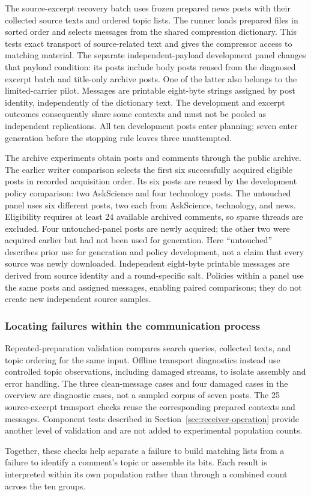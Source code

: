 The source-excerpt recovery batch uses \DsExcerptPosts{} frozen prepared news posts with their collected source texts and ordered topic lists. The runner loads prepared files in sorted order and selects messages from the shared compression dictionary. This tests exact transport of source-related text and gives the compressor access to matching material. The separate independent-payload development panel changes that payload condition: its \DsIndependentPosts{} posts include \DsDevelopmentReused{} body posts reused from the diagnosed excerpt batch and \DsDevelopmentAdditional{} title-only archive posts. One of the latter also belongs to the limited-carrier pilot. Messages are printable eight-byte strings assigned by post identity, independently of the dictionary text. The development and excerpt outcomes consequently share some contexts and must not be pooled as independent replications. All ten development posts enter planning; seven enter generation before the stopping rule leaves three unattempted.

The archive experiments obtain posts and comments through the public archive. The earlier writer comparison selects the first six successfully acquired eligible posts in recorded acquisition order. Its six posts are reused by the development policy comparison: two AskScience and four technology posts. The untouched panel uses six different posts, two each from AskScience, technology, and news. Eligibility requires at least 24 available archived comments, so sparse threads are excluded. Four untouched-panel posts are newly acquired; the other two were acquired earlier but had not been used for generation. Here ``untouched'' describes prior use for generation and policy development, not a claim that every source was newly downloaded. Independent eight-byte printable messages are derived from source identity and a round-specific salt. Policies within a panel use the same posts and assigned messages, enabling paired comparisons; they do not create new independent source samples.

\subsubsection{Locating failures within the communication process}
Repeated-preparation validation compares search queries, collected texts, and topic ordering for the same input. Offline transport diagnostics instead use controlled topic observations, including damaged streams, to isolate assembly and error handling. The three clean-message cases and four damaged cases in the overview are diagnostic cases, not a sampled corpus of seven posts. The 25 source-excerpt transport checks reuse the corresponding prepared contexts and messages. Component tests described in Section~\ref{sec:receiver-operation} provide another level of validation and are not added to experimental population counts.

Together, these checks help separate a failure to build matching lists from a failure to identify a comment's topic or assemble its bits. Each result is interpreted within its own population rather than through a combined count across the ten groups.
